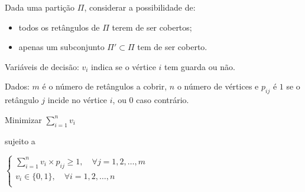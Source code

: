 \documentclass{article}
\begin{document}
Dada uma partição $\Pi$, considerar a possibilidade de:
\begin{itemize}[leftmargin=1.5cm]
	\item todos os retângulos de $\Pi$ terem de ser cobertos;
	\item apenas um subconjunto $\Pi' \subset \Pi$  tem de ser coberto.
\end{itemize}

Variáveis de decisão: $v_{i}$ indica se o vértice $i$ tem guarda ou não.

Dados: $m$ é o número de retângulos a cobrir, $n$ o número de vértices e $p_{ij}$ é $1$ se o retângulo $j$ incide no vértice $i$, ou $0$ caso contrário.

Minimizar
$\displaystyle \sum_{i = 1}^{n} v_{i}$

sujeito a

\(
\begin{cases}
	\sum_{i = 1}^{n} v_{i} \times p_{ij} \ge 1, \quad \forall j = 1,2,\dots,m \\
	v_{i} \in \{0,1\}, \quad \forall i = 1,2,\dots,n                          \\
\end{cases}
\)
\end{document}
